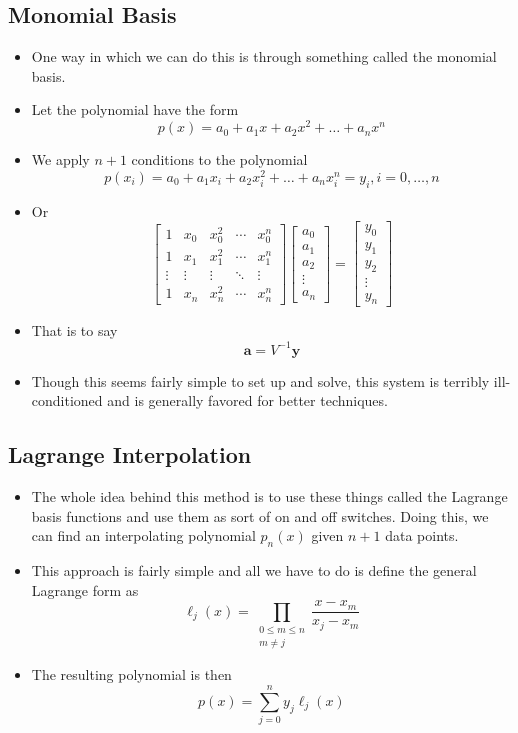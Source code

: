 \documentclass{article}
\begin{document}
\subsection*{Monomial Basis}
\begin{itemize}
\item One way in which we can do this is through something called the monomial basis.
\item Let the polynomial have the form
\[
p(x)=a_0+a_1x+a_2x^2+\dots+a_nx^n
\]
\item We apply $n+1$ conditions to the polynomial
\[
p(x_i)=a_0+a_1x_i+a_2x_i^2+\dots+a_nx_i^n=y_i, i = 0,\dots,n
\]
\item Or
\[
\begin{bmatrix}
1 & x_0 & x_0^2 & \cdots & x_0^n \\
1 & x_1 & x_1^2 & \cdots & x_1^n \\
\vdots & \vdots & \vdots & \ddots & \vdots \\
1 & x_n & x_n^2 & \cdots & x_n^n
\end{bmatrix}
\begin{bmatrix}
a_0 \\
a_1 \\
a_2 \\
\vdots \\
a_n
\end{bmatrix}
=
\begin{bmatrix}
y_0 \\
y_1 \\
y_2 \\
\vdots \\
y_n
\end{bmatrix}
\]
\item That is to say 
\[
\mathbf{a} = V^{-1} \mathbf{y}
\]
\item Though this seems fairly simple to set up and solve, this system is terribly ill-conditioned and is generally favored for better techniques.
\end{itemize}
\subsection*{Lagrange Interpolation}
\begin{itemize}
\item The whole idea behind this method is to use these things called the Lagrange basis functions and use them as sort of on and off switches. Doing this, we can find an interpolating polynomial $p_n(x)$ given $n+1$ data points.
\item This approach is fairly simple and all we have to do is define the general Lagrange form as
\[
\ell_j(x) = \prod_{\substack{0 \leq m \leq n \\ m \neq j}} \frac{x - x_m}{x_j - x_m}
\]
\item The resulting polynomial is then
\[
p(x) = \sum_{j=0}^{n} y_j \ell_j(x)
\]
\end{itemize}
\end{document}
